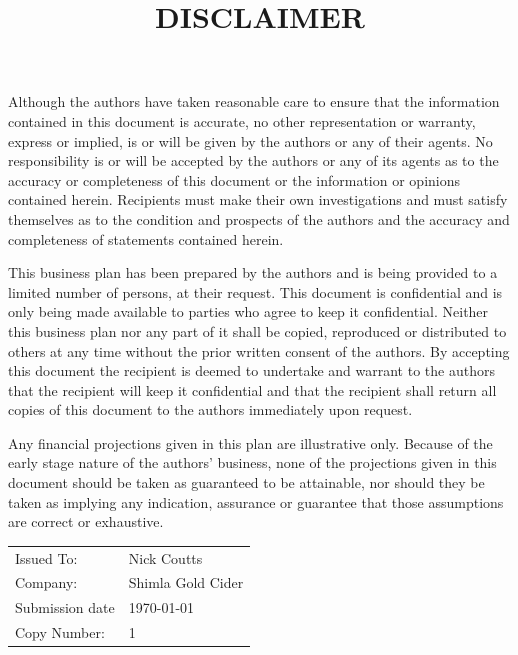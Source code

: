 \documentclass[11pt]{article}
\begin{document}
\title{DISCLAIMER}
\maketitle
Although the authors have taken reasonable care to ensure that the information
contained in this document is accurate, no other representation or warranty,
express or implied, is or will be given by the authors or any of their agents.
No responsibility is or will be accepted by the authors or any of its agents as
to the accuracy or completeness of this document or the information or opinions
contained herein. Recipients must make their own investigations and must satisfy
themselves as to the condition and prospects of the authors and the accuracy
and completeness of statements contained herein.

This business plan has been prepared by the authors and is being provided to a
limited number of persons, at their request. This document is confidential and
is only being made available to parties who agree to keep it confidential.
Neither this business plan nor any part of it shall be copied, reproduced or
distributed to others at any time without the prior written consent of the
authors. By accepting this document the recipient is deemed to undertake and
warrant to the authors that the recipient will keep it confidential and that the
recipient shall return all copies of this document to the authors immediately
upon request.

Any financial projections given in this plan are illustrative only. Because of
the early stage nature of the authors' business, none of the projections given
in this document should be taken as guaranteed to be attainable, nor should they
be taken as implying any indication, assurance or guarantee that those
assumptions are correct or exhaustive.

\vfill
\begin{table}[H]
\begin{center}
\begin{tabular}{| l l |}
\hline
Issued To:      &  Nick Coutts        \\
Company:        &  Shimla Gold Cider  \\
Submission date &  \today             \\
Copy Number:    &  1                  \\
\hline
\end{tabular}
\end{center}
\end{table}
\end{document}
